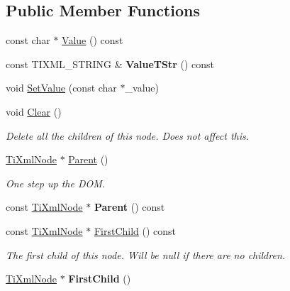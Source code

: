 \subsection*{Public Member Functions}
\begin{DoxyCompactItemize}
\item 
const char $\ast$ \hyperlink{classTiXmlNode_a77943eb90d12c2892b1337a9f5918b41}{Value} () const 
\item 
const T\+I\+X\+M\+L\+\_\+\+S\+T\+R\+I\+NG \& {\bfseries Value\+T\+Str} () const \hypertarget{classTiXmlNode_a83ece13d2ea66dac66e0b21332229239}{}\label{classTiXmlNode_a83ece13d2ea66dac66e0b21332229239}

\item 
void \hyperlink{classTiXmlNode_a2a38329ca5d3f28f98ce932b8299ae90}{Set\+Value} (const char $\ast$\+\_\+value)
\item 
void \hyperlink{classTiXmlNode_a708e7f953df61d4d2d12f73171550a4b}{Clear} ()\hypertarget{classTiXmlNode_a708e7f953df61d4d2d12f73171550a4b}{}\label{classTiXmlNode_a708e7f953df61d4d2d12f73171550a4b}

\begin{DoxyCompactList}\small\item\em Delete all the children of this node. Does not affect \textquotesingle{}this\textquotesingle{}. \end{DoxyCompactList}\item 
\hyperlink{classTiXmlNode}{Ti\+Xml\+Node} $\ast$ \hyperlink{classTiXmlNode_ab643043132ffd794f8602685d34a982e}{Parent} ()\hypertarget{classTiXmlNode_ab643043132ffd794f8602685d34a982e}{}\label{classTiXmlNode_ab643043132ffd794f8602685d34a982e}

\begin{DoxyCompactList}\small\item\em One step up the D\+OM. \end{DoxyCompactList}\item 
const \hyperlink{classTiXmlNode}{Ti\+Xml\+Node} $\ast$ {\bfseries Parent} () const \hypertarget{classTiXmlNode_a78878709e53066f06eb4fcbcdd3a5260}{}\label{classTiXmlNode_a78878709e53066f06eb4fcbcdd3a5260}

\item 
const \hyperlink{classTiXmlNode}{Ti\+Xml\+Node} $\ast$ \hyperlink{classTiXmlNode_a44c8eee26bbe2d1b2762038df9dde2f0}{First\+Child} () const \hypertarget{classTiXmlNode_a44c8eee26bbe2d1b2762038df9dde2f0}{}\label{classTiXmlNode_a44c8eee26bbe2d1b2762038df9dde2f0}

\begin{DoxyCompactList}\small\item\em The first child of this node. Will be null if there are no children. \end{DoxyCompactList}\item 
\hyperlink{classTiXmlNode}{Ti\+Xml\+Node} $\ast$ {\bfseries First\+Child} ()\hypertarget{classTiXmlNode_a5e97d69b7c0ebd27fb7286be56559b77}{}\label{classTiXmlNode_a5e97d69b7c0ebd27fb7286be56559b77}


\end{DoxyCompactItemize}
